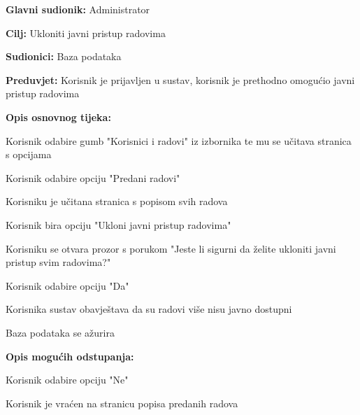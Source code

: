 					\noindent {}
					\begin{packed_item}
						\item \textbf{Glavni sudionik:} Administrator
						\item \textbf{Cilj:} Ukloniti javni pristup radovima
						\item \textbf{Sudionici:} Baza podataka
						\item \textbf{Preduvjet:} Korisnik je prijavljen u sustav, korisnik je prethodno omogućio javni pristup radovima
						
						\item \textbf{Opis osnovnog tijeka:} 
						\item[] \begin{packed_enum}
							
							\item Korisnik odabire gumb "Korisnici i radovi" iz izbornika te mu se učitava stranica s opcijama
							\item Korisnik odabire opciju "Predani radovi" 
							\item Korisniku je učitana stranica s popisom svih radova
							\item Korisnik bira opciju "Ukloni javni pristup radovima"
							\item Korisniku se otvara prozor s porukom "Jeste li sigurni da želite ukloniti javni pristup svim radovima?"
							\item Korisnik odabire opciju "Da"
							\item Korisnika sustav obavještava da su radovi više nisu javno dostupni
							\item Baza podataka se ažurira
						\end{packed_enum}
						
						\item \textbf{Opis mogućih odstupanja:}
						\item[] \begin{packed_enum}
						
							\item[6.a] Korisnik odabire opciju "Ne"
							\item[] \begin{packed_enum}
								\item[1.] Korisnik je vraćen na stranicu popisa predanih radova
							\end{packed_enum} 
						\end{packed_enum}
					\end{packed_item}

